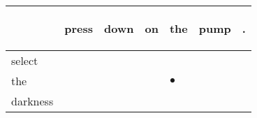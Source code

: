 \documentclass[landscape]{article}
\newcommand{\ssp}{\hspace{2pt}}
\newcommand{\mex}{\cellcolor{g}$\bullet$}
\begin{document}
\noindent\begin{tabular}{|l|p{10pt}|p{10pt}|p{10pt}|p{10pt}|p{10pt}|p{10pt}|}
\hline
&\begin{sideways}\cellcolor{ref0}press\hspace{12pt}\end{sideways}&\begin{sideways}\cellcolor{ref1}down\hspace{12pt}\end{sideways}&\begin{sideways}\cellcolor{ref2}on\hspace{12pt}\end{sideways}&\begin{sideways}\cellcolor{ref3}the\hspace{12pt}\end{sideways}&\begin{sideways}\cellcolor{ref4}pump\hspace{12pt}\end{sideways}&\begin{sideways}\cellcolor{ref5}.\hspace{12pt}\end{sideways}\\
\hline
\ssp select \ssp&\hspace{2pt}&\hspace{2pt}&\hspace{2pt}&\hspace{2pt}&\hspace{2pt}&\hspace{2pt}\\
\hline
\ssp \cellcolor{ref3}the \ssp&\hspace{2pt}&\hspace{2pt}&\hspace{2pt}&\hspace{2pt}\mex&\hspace{2pt}&\hspace{2pt}\\
\hline
\ssp darkness \ssp&\hspace{2pt}&\hspace{2pt}&\hspace{2pt}&\hspace{2pt}&\hspace{2pt}&\hspace{2pt}\\

\end{tabular}
\end{document}
